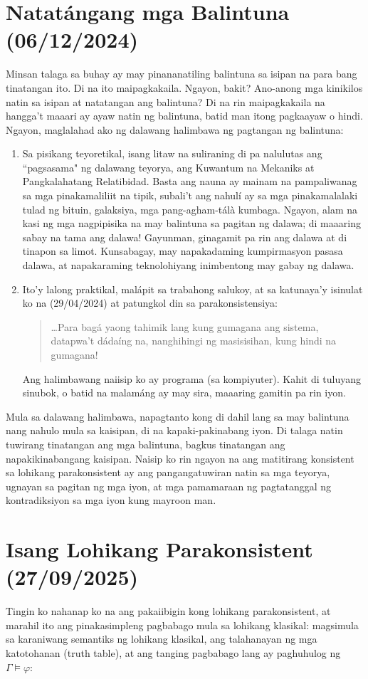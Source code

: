 \documentclass{article}
\begin{document}
\section{Natatángang mga Balintuna (06/12/2024)}
Minsan talaga sa buhay ay may pinananatiling balintuna sa isipan na para bang tinatangan ito. Di na ito maipagkakaila. Ngayon, bakit? Ano-anong mga kinikilos natin sa isipan at natatangan ang balintuna? Di na rin maipagkakaila na hangga't maaari ay ayaw natin ng balintuna, batid man itong pagkaayaw o hindi. Ngayon, maglalahad ako ng dalawang halimbawa ng pagtangan ng balintuna:
\begin{enumerate}
\item Sa pisikang teyoretikal, isang litaw na suliraning di pa nalulutas ang ``pagsasama" ng dalawang teyorya, ang Kuwantum na Mekaniks at Pangkalahatang Relatibidad. Basta ang nauna ay mainam na pampaliwanag sa mga pinakamaliliit na tipik, subali't ang nahulí ay sa mga pinakamalalaki tulad ng bituin, galaksiya, mga pang-agham-tálà kumbaga. Ngayon, alam na kasi ng mga nagpipisika na may balintuna sa pagitan ng dalawa; di maaaring sabay na tama ang dalawa! Gayunman, ginagamit pa rin ang dalawa at di tinapon sa limot. Kunsabagay, may napakadaming kumpirmasyon pasasa dalawa, at napakaraming teknolohiyang inimbentong may gabay ng dalawa.
\item Ito'y lalong praktikal, malápit sa trabahong salukoy, at sa katunaya'y isinulat ko na (29/04/2024) at patungkol din sa parakonsistensiya:
\begin{quote}
\ldots Para bagá yaong tahimik lang kung gumagana ang sistema, datapwa't dádaíng na, nanghihingi ng masisisihan, kung hindi na gumagana!
\end{quote}
Ang halimbawang naiisip ko ay programa (sa kompiyuter). Kahit di tuluyang sinubok, o batid na malamáng ay may sira, maaaring gamitin pa rin iyon.
\end{enumerate}
Mula sa dalawang halimbawa, napagtanto kong di dahil lang sa may balintuna nang nahulo mula sa kaisipan, di na kapaki-pakinabang iyon. Di talaga natin tuwirang tinatangan ang mga balintuna, bagkus tinatangan ang napakikinabangang kaisipan. Naisip ko rin ngayon na ang matitirang konsistent sa lohikang parakonsistent ay ang pangangatuwiran natin sa mga teyorya, ugnayan sa pagitan ng mga iyon, at mga pamamaraan ng pagtatanggal ng kontradiksiyon sa mga iyon kung mayroon man.

\section{Isang Lohikang Parakonsistent (27/09/2025)} \label{paracon}
Tingin ko nahanap ko na ang pakaiibigin kong lohikang parakonsistent, at marahil ito ang pinakasimpleng pagbabago mula sa lohikang klasikal: magsimula sa karaniwang semantiks ng lohikang klasikal, ang talahanayan ng mga katotohanan (truth table), at ang tanging pagbabago lang ay paghuhulog ng $\Gamma\models\varphi$:
\end{document}
